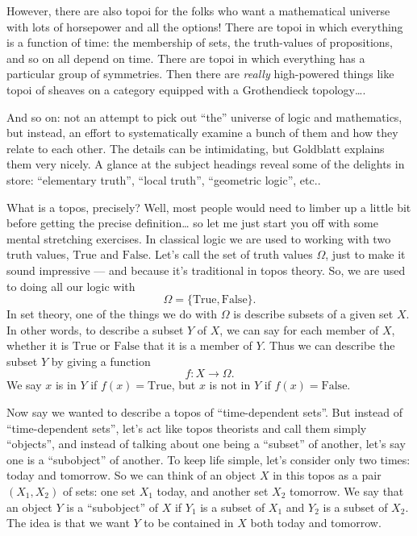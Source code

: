 \documentclass{article}
\begin{document}
However, there are also topoi for the folks who want a mathematical
universe with lots of horsepower and all the options! There are topoi in
which everything is a function of time: the membership of sets, the
truth-values of propositions, and so on all depend on time. There are
topoi in which everything has a particular group of symmetries. Then
there are \emph{really} high-powered things like topoi of sheaves on a
category equipped with a Grothendieck topology\ldots.

And so on: not an attempt to pick out ``the'' universe of logic and
mathematics, but instead, an effort to systematically examine a bunch of
them and how they relate to each other. The details can be intimidating,
but Goldblatt explains them very nicely. A glance at the subject
headings reveal some of the delights in store: ``elementary truth'',
``local truth'', ``geometric logic'', etc..

What is a topos, precisely? Well, most people would need to limber up a
little bit before getting the precise definition\ldots{} so let me just
start you off with some mental stretching exercises. In classical logic
we are used to working with two truth values, \(\mathrm{True}\) and
\(\mathrm{False}\). Let's call the set of truth values \(\Omega\), just
to make it sound impressive --- and because it's traditional in topos
theory. So, we are used to doing all our logic with
\[\Omega = \{\mathrm{True}, \mathrm{False}\}.\] In set theory, one of
the things we do with \(\Omega\) is describe subsets of a given set
\(X\). In other words, to describe a subset \(Y\) of \(X\), we can say
for each member of \(X\), whether it is \(\mathrm{True}\) or
\(\mathrm{False}\) that it is a member of \(Y\). Thus we can describe
the subset \(Y\) by giving a function \[f\colon X \to \Omega.\] We say
\(x\) is in \(Y\) if \(f(x) = \mathrm{True}\), but \(x\) is not in \(Y\)
if \(f(x) = \mathrm{False}\).

Now say we wanted to describe a topos of ``time-dependent sets''. But
instead of ``time-dependent sets'', let's act like topos theorists and
call them simply ``objects'', and instead of talking about one being a
``subset'' of another, let's say one is a ``subobject'' of another. To
keep life simple, let's consider only two times: today and tomorrow. So
we can think of an object \(X\) in this topos as a pair \((X_1, X_2)\)
of sets: one set \(X_1\) today, and another set \(X_2\) tomorrow. We say
that an object \(Y\) is a ``subobject'' of \(X\) if \(Y_1\) is a subset
of \(X_1\) and \(Y_2\) is a subset of \(X_2\). The idea is that we want
\(Y\) to be contained in \(X\) both today and tomorrow.
\end{document}
